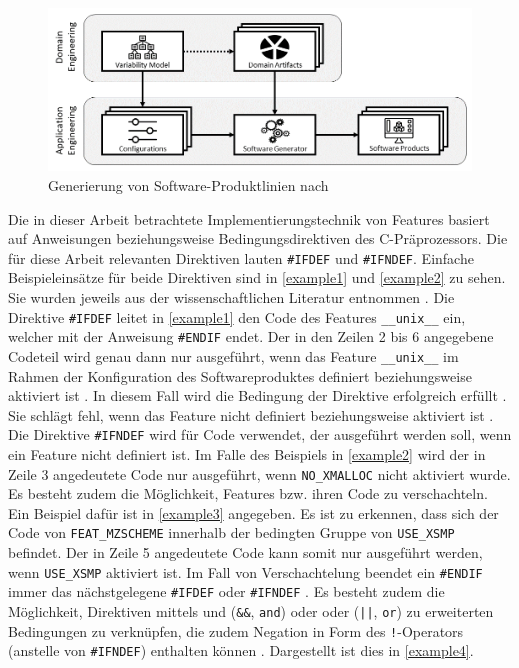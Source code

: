 \begin{figure}[t]
    \centering
    \includegraphics[width=\textwidth]{images/SPL}
    \caption{Generierung von Software-Produktlinien nach \cite{Thuem2014}\label{fig:spl}}
\end{figure}

Die in dieser Arbeit betrachtete Implementierungstechnik von Features basiert auf Anweisungen beziehungsweise Bedingungsdirektiven des C-Präprozessors. Die für diese Arbeit relevanten Direktiven lauten \texttt{\#IFDEF} und \texttt{\#IFNDEF}. Einfache Beispieleinsätze für beide Direktiven sind in \autoref{example1} und \autoref{example2} zu sehen. Sie wurden jeweils aus der wissenschaftlichen Literatur entnommen \cite{Medeiros2018,Preschern2019}. Die Direktive \texttt{\#IFDEF} leitet in \autoref{example1} den Code des Features \texttt{\_\_unix\_\_} ein, welcher mit der Anweisung \texttt{\#ENDIF} endet. Der in den Zeilen 2 bis 6 angegebene Codeteil wird genau dann nur ausgeführt, wenn das Feature \texttt{\_\_unix\_\_} im Rahmen der Konfiguration des Softwareproduktes definiert beziehungsweise aktiviert ist \cite{Stallmann2016}. In diesem Fall wird die Bedingung der Direktive erfolgreich erfüllt \cite{Stallmann2016}. Sie schlägt fehl, wenn das Feature nicht definiert beziehungsweise aktiviert ist \cite{Stallmann2016}. Die Direktive \texttt{\#IFNDEF} wird für Code verwendet, der ausgeführt werden soll, wenn ein Feature nicht definiert ist. Im Falle des Beispiels in \autoref{example2} wird der in Zeile 3 angedeutete Code nur ausgeführt, wenn \texttt{NO\_XMALLOC} nicht aktiviert wurde.
Es besteht zudem die Möglichkeit, Features bzw. ihren Code zu verschachteln. Ein Beispiel dafür ist in \autoref{example3} angegeben. Es ist zu erkennen, dass sich der Code von \texttt{FEAT\_MZSCHEME} innerhalb der bedingten Gruppe von \texttt{USE\_XSMP} befindet. Der in Zeile 5 angedeutete Code kann somit nur ausgeführt werden, wenn \texttt{USE\_XSMP} aktiviert ist. Im Fall von Verschachtelung beendet ein \texttt{\#ENDIF} immer das nächstgelegene \texttt{\#IFDEF} oder \texttt{\#IFNDEF} \cite{Stallmann2016}. Es besteht zudem die Möglichkeit, Direktiven mittels \glqq und\grqq{} (\texttt{\&\&}, \texttt{and}) oder \glqq oder\grqq{} (\texttt{||}, \texttt{or}) zu erweiterten Bedingungen zu verknüpfen, die zudem Negation in Form des \texttt{!}-Operators (anstelle von \texttt{\#IFNDEF}) enthalten können \cite{Stallmann2016,Queiroz2015}. Dargestellt ist dies in \autoref{example4}.

